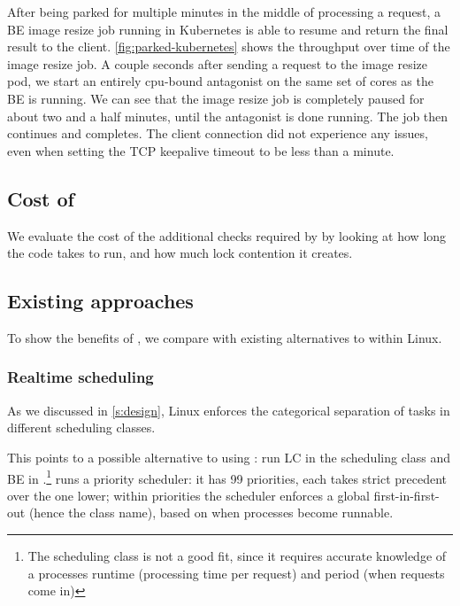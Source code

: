 After being parked for multiple minutes in the middle of processing a request, a
BE image resize job running in Kubernetes is able to resume and return the final
result to the client. \autoref{fig:parked-kubernetes} shows the throughput over
time of the image resize job. A couple seconds after sending a request to the
image resize pod, we start an entirely cpu-bound antagonist on the same set of
cores as the BE is running. We can see that the image resize job is completely
paused for about two and a half minutes, until the antagonist is done running.
The job then continues and completes. The client connection did not experience
any issues, even when setting the TCP keepalive timeout to be less than a
minute.



\subsection{Cost of \schedbe{}}

We evaluate the cost of the additional checks required by \schedbe{} by looking
at how long the code takes to run, and how much lock contention it
creates.




\subsection{Existing approaches}\label{ss:eval:existing}

To show the benefits of \schedbe{}, we compare with existing alternatives to
\cgroups{} within Linux.

\subsubsection{Realtime scheduling}

As we discussed in \autoref{s:design}, Linux enforces the categorical
separation of tasks in different scheduling classes. 

This points to a possible alternative to using \cgroups{}: run LC in the
\fifoclass{} scheduling class and BE in \normalclass{}.\footnote{The
\deadlineclass{} scheduling class is not a good fit, since it requires accurate
knowledge of a processes runtime (processing time per request) and period (when
requests come in)} \fifoclass{} runs a priority scheduler: it has 99 priorities,
each takes strict precedent over the one lower; within priorities the scheduler
enforces a global first-in-first-out (hence the \fifoclass{} class name), based
on when processes become runnable.

